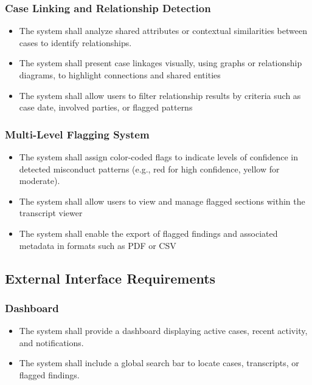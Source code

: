 \documentclass[12pt]{article}
\begin{document}
\subsubsection{Case Linking and Relationship Detection}
\begin{itemize}
  \item   The system shall analyze shared attributes or contextual similarities between cases to identify
 relationships.
  \item  The system shall present case linkages visually, using graphs or relationship diagrams, to
 highlight connections and shared entities
\item   The system shall allow users to filter relationship results by criteria such as case date,
 involved parties, or flagged patterns
\end{itemize}

\subsubsection{Multi-Level Flagging System}
\begin{itemize}
  \item   The system shall assign color-coded flags to indicate levels of confidence in detected
 misconduct patterns (e.g., red for high confidence, yellow for moderate).

  \item  The system shall allow users to view and manage flagged sections within the transcript
 viewer
\item  The system shall enable the export of flagged findings and associated metadata in formats
 such as PDF or CSV
\end{itemize}

\subsection{External Interface Requirements}
\subsubsection{Dashboard}
\begin{itemize}
  \item  The system shall provide a dashboard displaying active cases, recent activity, and
 notifications.
  \item  The system shall include a global search bar to locate cases, transcripts, or flagged findings.

\end{itemize}
\end{document}
